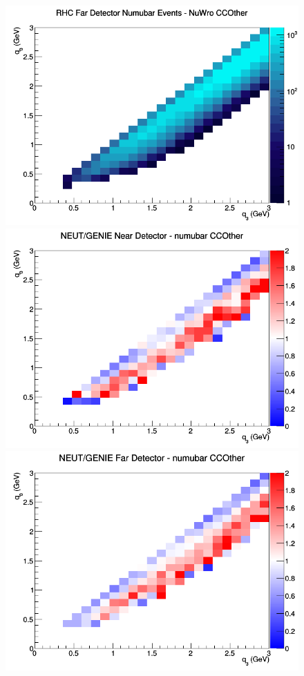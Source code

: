 \documentclass[12pt]{article}
\begin{document}
\begin{figure}[h]
\endminipage
{}
\includegraphics[width=\linewidth]{q0_q3/nominal/CCOther_RHC_FD_numubar_q3_q0_NuWro.png}
\endminipage
\newline
{}
\includegraphics[width=\linewidth]{q0_q3/nominal/ratios/CCOther_NEUT_GENIE_numubar_near_q3_q0.png}
\endminipage
{}
\includegraphics[width=\linewidth]{q0_q3/nominal/ratios/CCOther_NEUT_GENIE_numubar_far_q3_q0.png}

\end{figure}
\end{document}
